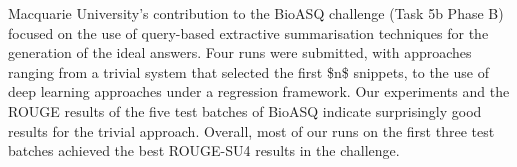 Macquarie University's contribution to the BioASQ challenge (Task 5b Phase B) focused on the use of query-based extractive summarisation techniques for the generation of the ideal answers. Four runs were submitted, with approaches ranging from a trivial system that selected the first \$n\$ snippets, to the use of deep learning approaches under a regression framework. Our experiments and the ROUGE results of the five test batches of BioASQ indicate surprisingly good results for the trivial approach. Overall, most of our runs on the first three test batches achieved the best ROUGE-SU4 results in the challenge.

